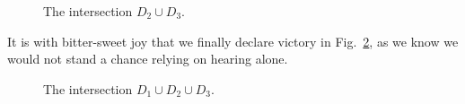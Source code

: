 \begin{example}
	\begin{figure}[htbp]
    	\centering
		\caption[Intersecting Bars 8--10 with Bars 19--23 in Webern's Op.~27]{The intersection $D_2 \cup D_3$.}
    	\label{fig:webern-aggregate-g}
	\end{figure}

	\noindent It is with bitter-sweet joy that we finally declare victory in Fig.~\ref{fig:webern-aggregate-h}, as we know we would not stand a chance relying on hearing alone.

	\begin{figure}[htbp]
    	\centering
		\caption[The intersection of Bars 1--7, 8--10, and 19--23 in Webern's Op.~27]{The intersection $D_1 \cup D_2 \cup D_3$.}
    	\label{fig:webern-aggregate-h}
	\end{figure}

\end{example}

